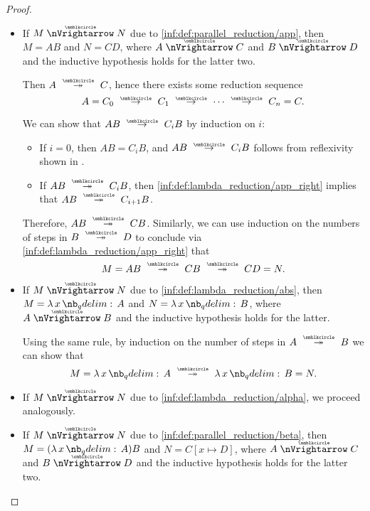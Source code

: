 \begin{proof}
\begin{itemize}
    \item If \( M \ppred N \) due to \ref{inf:def:parallel_reduction/app}, then \( M = AB \) and \( N = CD \), where \( A \ppred C \) and \( B \ppred D \) and the inductive hypothesis holds for the latter two.

    Then \( A \pred* C \), hence there exists some reduction sequence
    \begin{equation*}
      A = C_0 \pred C_1 \pred \cdots \pred C_n = C.
    \end{equation*}

    We can show that \( AB \pred C_i B \) by induction on \( i \):
    \begin{itemize}
      \item If \( i = 0 \), then \( AB = C_i B \), and \( AB \pred C_i B \) follows from reflexivity shown in .

      \item If \( AB \pred* C_i B \), then \ref{inf:def:lambda_reduction/app_right} implies that \( AB \pred* C_{i+1} B \).
    \end{itemize}

    Therefore, \( AB \pred* CB \). Similarly, we can use induction on the numbers of steps in \( B \pred* D \) to conclude via \ref{inf:def:lambda_reduction/app_right} that
    \begin{equation*}
      M = AB \pred* CB \pred* CD = N.
    \end{equation*}

    \item If \( M \ppred N \) due to \ref{inf:def:lambda_reduction/abs}, then \( M = \qabs x A \) and \( N = \qabs x B \), where \( A \ppred B \) and the inductive hypothesis holds for the latter.

    Using the same rule, by induction on the number of steps in \( A \pred* B \) we can show that
    \begin{equation*}
      M = \qabs x A \pred* \qabs x B = N.
    \end{equation*}

    \item If \( M \ppred N \) due to \ref{inf:def:lambda_reduction/alpha}, we proceed analogously.

    \item If \( M \ppred N \) due to \ref{inf:def:parallel_reduction/beta}, then \( M = (\qabs x A)B \) and \( N = C[x \mapsto D] \), where \( A \ppred C \) and \( B \ppred D \) and the inductive hypothesis holds for the latter two.


\end{itemize}
\end{proof}
